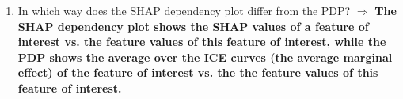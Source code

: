 \documentclass[a4paper]{article}
\begin{document}
{\begin{enumerate}
    \item In which way does the SHAP dependency plot differ from the PDP? $\Rightarrow$ \textbf{The SHAP dependency plot shows the SHAP values of a feature of interest vs. the feature values of this feature of interest, while the PDP shows the average over the ICE curves (the average marginal effect) of the feature of interest vs. the the feature values of this feature of interest.}
\end{enumerate}
}
\end{document}
